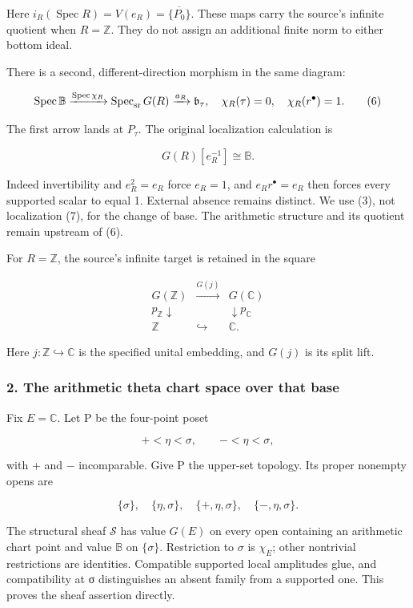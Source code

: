 \documentclass{article}
\begin{document}
Here \(i_R(\operatorname{Spec}R)=V(e_R)=\overline{\{P_0\}}\). These maps carry the source's infinite quotient when \(R=\mathbb Z\). They do not assign an additional finite norm to either bottom ideal.

There is a second, different-direction morphism in the same diagram:

\[
\operatorname{Spec}\mathbb B\xrightarrow{\operatorname{Spec}\chi_R}
\operatorname{Spec}_{\rm sr}G(R)\xrightarrow{a_R}\mathfrak b_\tau,
\quad
\chi_R(\tau)=0,\quad\chi_R(r^\bullet)=1.
\tag{6}
\]

The first arrow lands at \(P_\tau\). The original localization calculation is

\[
G(R)[e_R^{-1}]\cong\mathbb B.
\tag{7}
\]

Indeed invertibility and \(e_R^2=e_R\) force \(e_R=1\), and \(e_Rr^\bullet=e_R\) then forces every supported scalar to equal 1. External absence remains distinct. We use (3), not localization (7), for the change of base. The arithmetic structure and its quotient remain upstream of (6).

For \(R=\mathbb Z\), the source's infinite target is retained in the square

\[
\begin{array}{ccc}
G(\mathbb Z)&\xrightarrow{G(j)}&G(\mathbb C)\\
p_{\mathbb Z}\downarrow&&\downarrow p_{\mathbb C}\\
\mathbb Z&\hookrightarrow&\mathbb C.
\end{array}
\tag{8}
\]

Here \(j:\mathbb Z\hookrightarrow\mathbb C\) is the specified unital embedding, and \(G(j)\) is its split lift.

\subsubsection{2. The arithmetic theta chart space over that base}\label{endpoint-tau_base--the-arithmetic-theta-chart-space-over-that-base}

Fix \(E=\mathbb C\). Let P be the four-point poset

\[
+<\eta<\sigma,\qquad -<\eta<\sigma,
\tag{9}
\]

with + and − incomparable. Give P the upper-set topology. Its proper nonempty opens are

\[
\{\sigma\},\quad\{\eta,\sigma\},\quad
\{+,\eta,\sigma\},\quad\{-,\eta,\sigma\}.
\]

The structural sheaf \(\mathcal S\) has value \(G(E)\) on every open containing an arithmetic chart point and value \(\mathbb B\) on \(\{\sigma\}\). Restriction to \(\sigma\) is \(\chi_E\); other nontrivial restrictions are identities. Compatible supported local amplitudes glue, and compatibility at σ distinguishes an absent family from a supported one. This proves the sheaf assertion directly.
\end{document}
